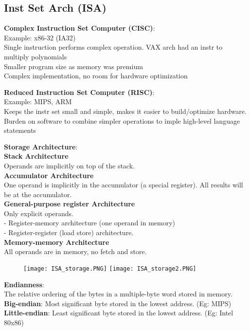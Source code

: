 \documentclass[a4paper,landscape]{article}
\newcommand{\rntopic}[1]{\vspace{-2.0em}\subsection*{#1}\vspace{-1.0em}}
\newcommand{\rnname}[1]{\textbf{#1}}
\begin{document}
\begin{multicols*}{4}
\rntopic{Inst Set Arch (ISA)}
\begin{flatitemize}
\item \rnname{Complex Instruction Set Computer (CISC)}: \\
Example: x86-32 (IA32) \\
Single instruction performs complex operation. VAX arch had an instr to multiply polynomials \\
Smaller program size as memory was premium \\
Complex implementation, no room for hardware optimization
\item \rnname{Reduced Instruction Set Computer (RISC)}:  \\
Example: MIPS, ARM \\
Keeps the instr set small and simple, makes it easier to build/optimize hardware. \\
Burden on software to combine simpler operations to imple high-level language statements 
\item \rnname{Storage Architecture}:\\
\textbf{Stack Architecture} \\
Operands are implicitly on top of the stack. \\
\textbf{Accumulator Architecture} \\
One operand is implicitly in the accumulator (a special register). All results will be at the accumulator. \\
\textbf{General-purpose register Architecture} \\
Only explicit operands.\\
- Register-memory architecture (one operand in memory)\\
- Register-register (load store) architecture.\\
\textbf{Memory-memory Architecture} \\
All operands are in memory, no fetch and store. \\
\vspace{-1.5em}
\begin{figure}[H]
  \texttt{[image: ISA\_storage.PNG]}
  \texttt{[image: ISA\_storage2.PNG]}
\end{figure}
\vspace{-2em}
\item \rnname{Endianness}:\\
The relative ordering of the bytes in a multiple-byte word stored in memory.\\
\textbf{Big-endian}: Most significant byte stored in the lowest address. (Eg: MIPS)\\
\textbf{Little-endian}: Least significant byte stored in the lowest address. (Eg: Intel 80x86)\\


\end{flatitemize}
\end{multicols*}
\end{document}
